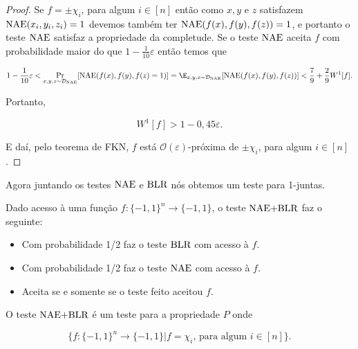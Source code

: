 \begin{proof}

Se $f = \pm \chi_{i}$, para algum $i \in [n]$ então como $x, y$ e $z$ satisfazem $\text{NAE}(x_{i}, y_{i}, z_{i}) = 1$ devemos também ter $\text{NAE}(f(x), f(y), f(z)) = 1$, e portanto o teste $\text{NAE}$ satisfaz a propriedade da completude. Se o teste $\text{NAE}$ aceita $f$ com probabilidade maior do que $1 - \frac{1}{10}\varepsilon$ então temos que

\begin{equation*}
	1 -\frac{1}{10}\varepsilon < \Pr_{x, y, z \sim \mathcal{D}_{\NAE}}[\NAE(f(x), f(y), f(z) = 1)] = \E_{x, y, z \sim \mathcal{D}_{\NAE}}[\NAE(f(x), f(y), f(z))] < \frac{7}{9} + \frac{2}{9}W^{1}[f].
\end{equation*}

Portanto,

\begin{equation*}
	W^{1}[f] > 1 - 0,45\varepsilon.
\end{equation*}

E daí, pelo teorema de FKN, $f$ está $\mathcal{O}(\varepsilon)$-próxima de $\pm \chi_{i}$, para algum $i \in [n]$.

\end{proof}

Agora juntando os testes $\text{NAE}$ e $\text{BLR}$ nós obtemos um teste para 1-juntas.

\begin{NAEplusBLRtest}

Dado acesso à uma função $f: \{-1, 1\}^{n} \to \{-1, 1\}$, o teste $\text{NAE+BLR}$ faz o seguinte:

\begin{itemize}

	\item Com probabilidade 1/2 faz o teste $\text{BLR}$ com acesso à $f$.
	
	\item Com probabilidade 1/2 faz o teste $\text{NAE}$ com acesso à $f$.
	
	\item Aceita se e somente se o teste feito aceitou $f$.

\end{itemize}

\end{NAEplusBLRtest}

\begin{prop}

O teste $\text{NAE+BLR}$ é um teste para a propriedade $P$ onde

\begin{equation*}
	\{f: \{-1, 1\}^{n} \to \{-1, 1\} \lvert f = \chi_{i} \text{, para algum } i \in [n]\}.
\end{equation*}

\end{prop}

